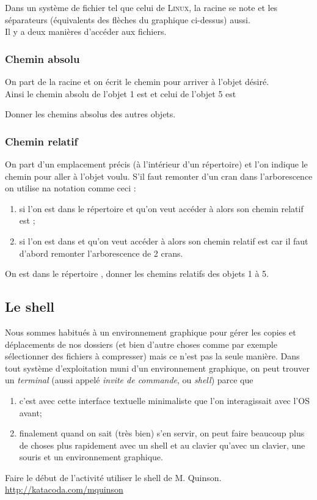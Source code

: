 \documentclass[a4paper,12pt,french]{book}
\begin{document}
	Dans un système de fichier tel que celui de \textsc{Linux}, la racine se note \tw{/} et les séparateurs (équivalents des flèches du graphique ci-dessus) aussi.\\
	Il y a deux manières d'accéder aux fichiers.
	\subsubsection*{Chemin absolu}
	On part de la racine et on écrit le chemin pour arriver à l'objet désiré.\\
	Ainsi le chemin absolu de l'objet 1 est  et celui de l'objet 5 est 
	
	\begin{exercice}[]
		Donner les chemins absolus des autres objets.
	\end{exercice}

	\subsubsection*{Chemin relatif}
	On part d'un emplacement précis (à l'intérieur d'un répertoire) et l'on indique le chemin pour aller à l'objet voulu. S'il faut remonter d'un cran dans l'arborescence on utilise na notation  comme ceci :
	\begin{enumerate}[--]
		\item 	si l'on est dans le répertoire  et qu'on veut accéder à  alors son chemin relatif est ;
		\item 	si l'on est dans  et qu'on veut accéder à  alors son chemin relatif est  car il faut d'abord remonter l'arborescence de 2 crans.
	\end{enumerate}

	\begin{exercice}[]
		On est dans le répertoire , donner les chemins relatifs des objets 1 à 5.
	\end{exercice}
	
	\subsection*{Le shell}
	
	Nous sommes habitués à un environnement graphique pour gérer les copies et déplacements de nos dossiers (et bien d'autre choses comme par exemple sélectionner des fichiers à compresser) mais ce n'est pas la seule manière. Dans tout système d'exploitation muni d'un environnement graphique, on peut trouver un \textit{terminal} (aussi appelé \textit{invite de commande}, ou \textit{shell}) parce que
	\begin{enumerate}[--]
		\item 	c'est avec cette interface textuelle minimaliste que l'on interagissait avec l'\textsc{OS} avant;
		\item 	finalement quand on sait (très bien) s'en servir, on peut faire beaucoup plus de choses plus rapidement avec un shell et au clavier qu'avec un clavier, une souris et un environnement graphique.
	\end{enumerate}

	\begin{exercice}[]
		Faire le début de l'activité \og utiliser le shell\fg{} de M. Quinson.\\
		\url{http://katacoda.com/mquinson}
	\end{exercice}
\end{document}

